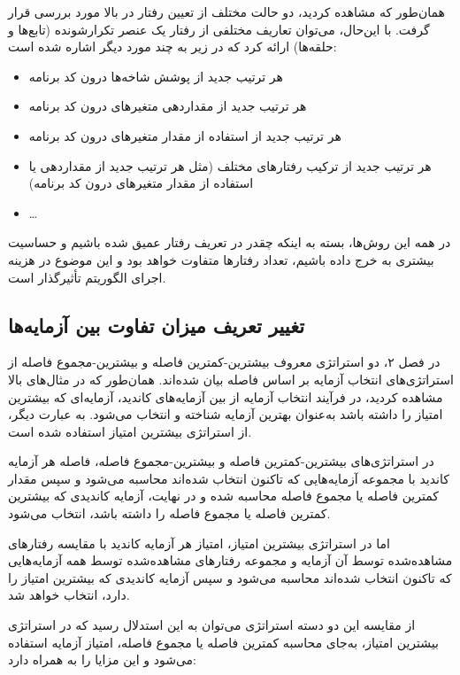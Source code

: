 همان‌طور که مشاهده کردید، دو حالت مختلف از تعیین رفتار در بالا مورد بررسی قرار گرفت. با این‌حال، می‌توان تعاریف مختلفی از رفتار یک عنصر تکرارشونده (تابع‌ها و حلقه‌ها) ارائه کرد که در زیر به چند مورد دیگر اشاره شده است:
\begin{itemize}
	\item هر ترتیب جدید از پوشش شاخه‌ها  درون کد برنامه
	\item هر ترتیب جدید از مقداردهی متغیرهای درون کد برنامه
	\item هر ترتیب جدید از استفاده از مقدار متغیرهای درون کد برنامه
	\item هر ترتیب جدید از ترکیب رفتارهای مختلف (مثل هر ترتیب جدید از مقداردهی یا استفاده از مقدار متغیرهای درون کد برنامه)
	\item \dots
\end{itemize}
در همه این روش‌ها، بسته به اینکه چقدر در تعریف رفتار عمیق شده باشیم و حساسیت بیشتری به خرج داده باشیم، تعداد رفتارها متفاوت خواهد بود و این موضوع در هزینه اجرای الگوریتم تأثیرگذار است.



\subsection{تغییر تعریف میزان تفاوت بین آزمایه‌ها}

در فصل ۲، دو استراتژی معروف بیشترین-کمترین فاصله و بیشترین-مجموع فاصله از استراتژی‌های انتخاب آزمایه بر اساس فاصله بیان شده‌اند. همان‌طور که در مثال‌های بالا مشاهده کردید، در فرآیند انتخاب آزمایه از بین آزمایه‌های کاندید، آزمایه‌ای که بیشترین امتیاز را داشته باشد به‌عنوان بهترین آزمایه شناخته و انتخاب می‌شود. به عبارت دیگر، از استراتژی بیشترین امتیاز استفاده شده است.

در استراتژی‌های بیشترین-کمترین فاصله و بیشترین-مجموع فاصله، فاصله هر آزمایه کاندید با مجموعه آزمایه‌هایی که تاکنون انتخاب شده‌اند محاسبه می‌شود و سپس مقدار کمترین فاصله یا مجموع فاصله محاسبه شده و در نهایت، آزمایه‌ کاندیدی که بیشترین کمترین فاصله یا مجموع فاصله را داشته باشد، انتخاب می‌شود.

اما در استراتژی بیشترین امتیاز، امتیاز هر آزمایه کاندید با مقایسه رفتارهای مشاهده‌شده توسط آن آزمایه و مجموعه رفتارهای مشاهده‌شده توسط همه آزمایه‌هایی که تاکنون انتخاب شده‌اند محاسبه می‌شود و سپس آزمایه کاندیدی که بیشترین امتیاز را دارد، انتخاب خواهد شد.

از مقایسه این دو دسته استراتژی می‌توان به این استدلال رسید که در استراتژی بیشترین امتیاز، به‌جای محاسبه کمترین فاصله یا مجموع فاصله، امتیاز آزمایه استفاده می‌شود و این مزایا را به همراه دارد:

